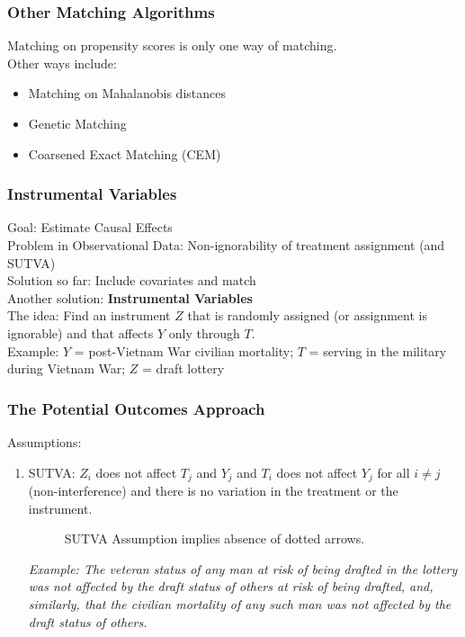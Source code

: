 \documentclass{beamer}
\begin{document}
\begin{frame}
\frametitle{Other Matching Algorithms}
\pause
Matching on propensity scores is only one way of matching. \\
\pause
\bigskip
Other ways include:
\pause
\begin{itemize}
\item Matching on Mahalanobis distances
\pause
\item Genetic Matching
\pause
\item Coarsened Exact Matching (CEM)
\end{itemize}
\end{frame}

\begin{frame}
\frametitle{Instrumental Variables}
\pause
Goal: Estimate Causal Effects\\
\bigskip
\pause
Problem in Observational Data: Non-ignorability of treatment
assignment \pause (and SUTVA) \\
\pause
\bigskip
Solution so far: Include covariates and match \\
\pause
\bigskip
Another solution: {\bf Instrumental Variables} \\
\pause
\bigskip
The idea: Find an instrument $Z$ that is randomly assigned (or
assignment is ignorable) and that affects $Y$ only through $T$. \\
\pause
\bigskip
Example: $Y$ = post-Vietnam War civilian mortality; \pause $T$ = serving in the
military during Vietnam War; \pause $Z$ = draft lottery
\end{frame}

\begin{frame}
\frametitle{The Potential Outcomes Approach}
\pause
Assumptions:
\pause
\bigskip
\begin{enumerate}
\item SUTVA:
\pause 
$Z_i$ does not affect $T_j$ and $Y_j$ and $T_i$ does not
affect $Y_j$ for all $i \neq j$ (non-interference) and there is no
variation in the treatment or the instrument.
\pause
\small
\begin{figure}[!htp]
\caption{SUTVA Assumption implies absence of dotted arrows.}
\centerline{
}
\end{figure}
\pause
\bigskip
\tiny
{\it Example: The veteran status of any man at risk of being drafted
in the lottery was not affected by the draft status of others at risk
of being drafted, and, similarly, that the civilian mortality of any
such man was not affected by the draft status of others.}
\normalsize
\end{enumerate}
\end{frame}
\end{document}
